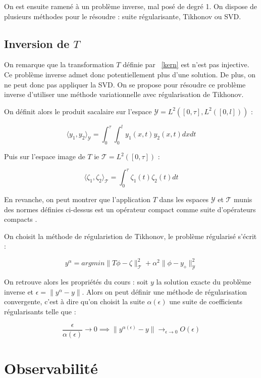 \documentclass[a4paper]{article}
\begin{document}
On est ensuite ramené à un problème inverse, mal posé de degré 1. 
On dispose de plusieurs méthodes pour le résoudre : suite régularisante, Tikhonov ou SVD.


\subsection{Inversion de $T$}

On remarque que la transformation $T$ définie par ~\eqref{kern} est n'est pas injective. 
Ce problème inverse admet donc potentiellement plus d'une solution. De plus, on ne peut donc pas appliquer la SVD. 
On se propose pour résoudre ce problème inverse d'utiliser une méthode variationnelle avec régularisation de Tikhonov.

On définit alors le produit sacalaire sur l'espace $\mathscr{Y} = L^2([0,\tau],L^2([0,l]))$ :

\[ \langle y_1, y_2 \rangle_{\mathscr{Y}} = \int_0^\tau \int_0^l y_1(x,t)y_2(x,t)dxdt \] 

Puis sur l'espace image de $T$ ie $\mathscr{T} = L^2([0,\tau])$ : 

\[ \langle \zeta_1, \zeta_2 \rangle_{\mathscr{T}}= \int_0^\tau \zeta_1(t) \zeta_2(t)dt \] 

En revanche, on peut montrer que l'application $T$ dans les espaces $\mathscr{Y}$ et $\mathscr{T}$ 
munis des normes définies ci-dessus 
est un opérateur compact 
comme suite d'opérateurs compacts \cite{MKern}. 

On choisit la méthode de régularistion de Tikhonov, le problème régularisé s'écrit :

\[ y^{\alpha} = argmin \| T \phi - \zeta \|_{\mathscr{T}}^2 + \alpha^2 \| \phi -y_{\diamond} \|_{\mathscr{Y}}^2 \]

On retrouve alors les propriétés du cours : soit $y$ la solution exacte du problème inverse et $ \epsilon = \| y^{\alpha} - y\|$. 
Alors on peut définir une méthode de régularisation convergente, 
c'est à dire qu'on choisit la suite $\alpha(\epsilon)$ une suite de coefficients régularisants telle que :

\[\frac{\epsilon}{\alpha(\epsilon)} \to 0 \implies \|y^{\alpha(\epsilon)} - y \| \to_{\epsilon \to 0} O (\epsilon)\]



\section{Observabilité}
\end{document}
